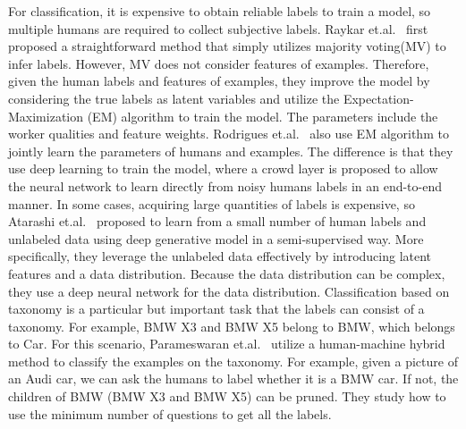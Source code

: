 For classification,  it is expensive to obtain reliable labels to train a model, so multiple humans are required to collect subjective labels.  Raykar et.al.~\cite{raykar2010learning} first proposed a straightforward method that simply utilizes majority voting(MV) to infer labels. However, MV does not consider  features of examples. Therefore, given the human labels and features of examples, they improve the model by considering the true labels as latent variables and utilize the Expectation-Maximization (EM) algorithm to train the model. The parameters include the worker qualities and feature weights. Rodrigues et.al.~\cite{DBLP:conf/aaai/RodriguesP18} also use EM algorithm to jointly learn the parameters of humans and examples. The difference is that they use deep learning to train the model, where a crowd layer is proposed to allow the neural network to learn directly from noisy humans labels in an end-to-end manner. In some cases, acquiring large quantities of labels is expensive, so Atarashi et.al.~\cite{DBLP:conf/aaai/AtarashiOK18} proposed to  learn from a small number of  human labels and unlabeled data   using deep generative model in a semi-supervised way. More specifically,  they leverage the unlabeled data effectively by introducing latent features and a data distribution. Because the data distribution can be complex, they use a deep neural network for the data distribution. 
Classification based on taxonomy is a particular but important task that the labels can consist of a taxonomy. For example, BMW X3 and   BMW X5 belong to  BMW, which belongs to Car. For this scenario, Parameswaran et.al.~\cite{DBLP:journals/pvldb/ParameswaranSGPW11} utilize a human-machine hybrid method to classify the examples on the taxonomy. For example, given a picture of an Audi car, we can ask the humans to label whether it is a BMW car. If not, the children of BMW (BMW X3 and BMW X5) can be pruned. They study how to use the minimum number of questions to get all  the labels.




